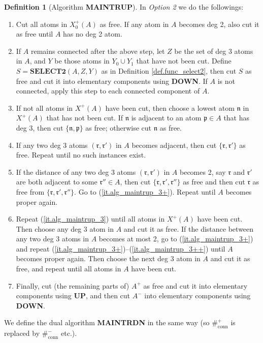 \documentclass[10pt, reqno]{amsart}
\newcommand{\pf}{\mathfrak p}
\newcommand{\rf}{\mathfrak r}
\newcommand{\nf}{\mathfrak n}
\theoremstyle{definition}
\newtheorem{definition}[theorem]{Definition}
\theoremstyle{remark}
\numberwithin{equation}{section}
\begin{document}
\begin{definition}[Algorithm \textbf{MAINTRUP}]
In \emph{Option 2} we do the followings:
\begin{enumerate}
\item\label{it.alg_maintrup_1}  Cut all atoms in $X_0^+(A)$ as free. If any atom in $A$ becomes deg 2, also cut it as free until $A$ has no deg 2 atom.
\item\label{it.alg_maintrup_2} If $A$ remains connected after the above step, let $Z$ be the set of deg 3 atoms in $A$, and $Y$ be those atoms in $Y_0\cup Y_1$ that have not been cut. Define $S=\textbf{SELECT2}(A,Z,Y)$ as in Definition \ref{def.func_select2}, then cut $S$ as free and cut it into elementary components using \textbf{DOWN}. If $A$ is not connected, apply this step to each connected component of $A$.
\item\label{it.alg_maintrup_3} If not all atoms in $X^+(A)$ have been cut, then choose a lowest atom $\nf$ in $X^+(A)$ that has not been cut. If $\nf$ is adjacent to an atom $\pf\in A$ that has deg 3, then cut $\{\nf,\pf\}$ as free; otherwise cut $\nf$ as free.
\item\label{it.alg_maintrup_3+} If any two deg 3 atoms $(\rf,\rf')$ in $A$ becomes adjacent, then cut $\{\rf,\rf'\}$ as free. Repeat until no such instances exist.
\item\label{it.alg_maintrup_3++} If the distance of any two deg 3 atoms $(\rf,\rf')$ in $A$ becomes 2, say $\rf$ and $\rf'$ are both adjacent to some $\rf''\in A$, then cut $\{\rf,\rf',\rf''\}$ as free and then cut $\rf$ as free from $\{\rf,\rf',\rf''\}$. Go to (\ref{it.alg_maintrup_3+}). Repeat until $A$ becomes proper again.
\item Repeat (\ref{it.alg_maintrup_3}) until all atoms in $X^+(A)$ have been cut. Then choose any deg 3 atom in $A$ and cut it as free. If the distance between any two deg 3 atoms in $A$ becomes at most 2, go to (\ref{it.alg_maintrup_3+}) and repeat (\ref{it.alg_maintrup_3+})--(\ref{it.alg_maintrup_3++}) until $A$ becomes proper again. Then choose the next deg 3 atom in $A$ and cut it as free, and repeat until all atoms in $A$ have been cut.
\item\label{it.alg_maintrup_5} Finally, cut (the remaining parts of) $A^+$ as free and cut it into elementary components using \textbf{UP}, and then cut $A^-$ into elementary components using \textbf{DOWN}.
\end{enumerate}
We define the dual algorithm \textbf{MAINTRDN} in the same way (so $\#_{\mathrm{conn}}^+$ is replaced by $\#_{\mathrm{conn}}^-$ etc.).
\end{definition}
\end{document}
